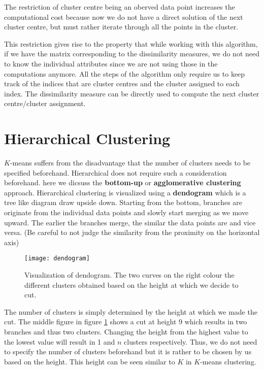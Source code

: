 \documentclass[../statistical_learning_notes.tex]{subfiles}
\begin{document}
    The restriction of cluster centre being an oberved data point increases the computational cost because now we do not have a direct solution of the next cluster centre, but must rather iterate through all the points in the cluster.\newline

    This restriction gives rise to the property that while working with this algorithm, if we have the matrix corresponding to the dissimilarity measures, we do not need to know the individual attributes since we are not using those in the computations anymore. All the steps of the algorithm only require us to keep track of the indices that are cluster centres and the cluster assigned to each index. The dissimilarity measure can be directly used to compute the next cluster centre/cluster assignment.


    \section{Hierarchical Clustering}
    $K$-means suffers from the disadvantage that the number of clusters needs to be specified beforehand. Hierarchical does not require such a consideration beforehand. here we dicsuss the \textbf{bottom-up} or \textbf{agglomerative clustering} approach. Hierarchical clustering is visualized using a \textbf{dendogram} which is a tree like diagram draw upside down. Starting from the bottom, branches are originate from the individual data points and slowly start merging as we move upward. The earlier the branches merge, the similar the data points are and vice versa. (Be careful to not judge the similarity from the proximity on the horizontal axis)\newline

    \begin{figure}[h]
    \texttt{[image: dendogram]}
    \centering
    \caption{Visualization of dendogram. The two curves on the right colour the different clusters obtained based on the height at which we decide to cut.}
    \label{fig:dendogram} %
    \end{figure}

    The number of clusters is simply determined by the height at which we made the cut. The middle figure in figure \ref{fig:dendogram} shows a cut at height 9 which results in two branches and thus two clusters.\newline
    Changing the height from the highest value to the lowest value will result in 1 and $n$ clusters respectively. Thus, we do not need to specify the number of clusters beforehand but it is rather to be chosen by us based on the height. This height can be seen similar to $K$ in $K$-means clustering.\newline
\end{document}

